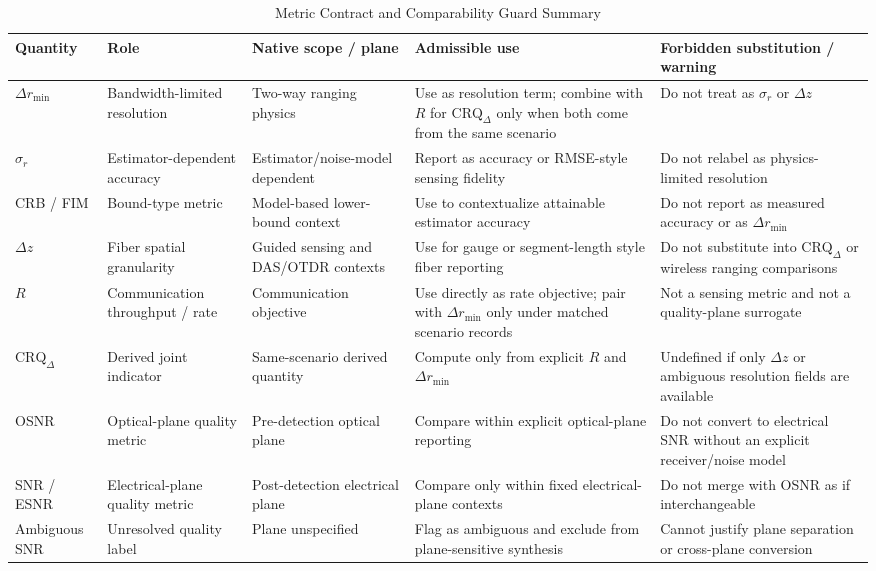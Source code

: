 \begin{table}[!t]
\caption{Metric Contract and Comparability Guard Summary}
\label{tab:ii-metric-contract}
\centering
\footnotesize
\begin{tabularx}{\textwidth}{>{\raggedright\arraybackslash}p{} >{\raggedright\arraybackslash}p{} >{\raggedright\arraybackslash}p{} >{\raggedright\arraybackslash}p{} >{\raggedright\arraybackslash}X}
\toprule
\textbf{Quantity} & \textbf{Role} & \textbf{Native scope / plane} & \textbf{Admissible use} & \textbf{Forbidden substitution / warning} \\
\midrule
$\Delta r_{\min}$ & Bandwidth-limited resolution & Two-way ranging physics & Use as resolution term; combine with $R$ for $\mathrm{CRQ}_{\Delta}$ only when both come from the same scenario & Do not treat as $\sigma_r$ or $\Delta z$ \\
$\sigma_r$ & Estimator-dependent accuracy & Estimator/noise-model dependent & Report as accuracy or RMSE-style sensing fidelity & Do not relabel as physics-limited resolution \\
CRB / FIM & Bound-type metric & Model-based lower-bound context & Use to contextualize attainable estimator accuracy & Do not report as measured accuracy or as $\Delta r_{\min}$ \\
$\Delta z$ & Fiber spatial granularity & Guided sensing and DAS/OTDR contexts & Use for gauge or segment-length style fiber reporting & Do not substitute into $\mathrm{CRQ}_{\Delta}$ or wireless ranging comparisons \\
$R$ & Communication throughput / rate & Communication objective & Use directly as rate objective; pair with $\Delta r_{\min}$ only under matched scenario records & Not a sensing metric and not a quality-plane surrogate \\
$\mathrm{CRQ}_{\Delta}$ & Derived joint indicator & Same-scenario derived quantity & Compute only from explicit $R$ and $\Delta r_{\min}$ & Undefined if only $\Delta z$ or ambiguous resolution fields are available \\
OSNR & Optical-plane quality metric & Pre-detection optical plane & Compare within explicit optical-plane reporting & Do not convert to electrical SNR without an explicit receiver/noise model \\
SNR / ESNR & Electrical-plane quality metric & Post-detection electrical plane & Compare only within fixed electrical-plane contexts & Do not merge with OSNR as if interchangeable \\
Ambiguous SNR & Unresolved quality label & Plane unspecified & Flag as ambiguous and exclude from plane-sensitive synthesis & Cannot justify plane separation or cross-plane conversion \\
\bottomrule
\end{tabularx}
\end{table}

